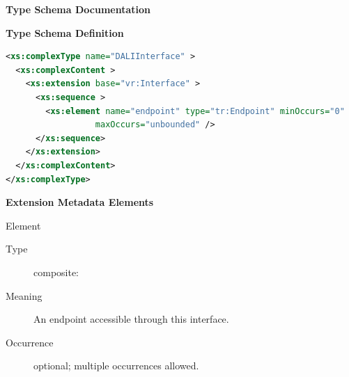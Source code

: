 \documentclass{ivoa}
\begin{document}
\begin{generated}
\begingroup
      	\renewcommand*\descriptionlabel[1]{%
      	\hbox to 5.5em{\emph{#1}\hfil}}\vspace{2ex}\noindent\textbf{ Type Schema Documentation}



\vspace{1ex}\noindent\textbf{ Type Schema Definition}

\begin{lstlisting}[language=XML,basicstyle=\footnotesize]
<xs:complexType name="DALIInterface" >
  <xs:complexContent >
    <xs:extension base="vr:Interface" >
      <xs:sequence >
        <xs:element name="endpoint" type="tr:Endpoint" minOccurs="0"
                  maxOccurs="unbounded" />
      </xs:sequence>
    </xs:extension>
  </xs:complexContent>
</xs:complexType>
\end{lstlisting}

\vspace{0.5ex}\noindent\textbf{ Extension Metadata Elements}

\begingroup\small\begin{bigdescription}\item[Element \xmlel{endpoint}]
\begin{description}
\item[Type] composite: 
\item[Meaning] 
                An endpoint accessible through this interface.
              
\item[Occurrence] optional; multiple occurrences allowed.

\end{description}


\end{bigdescription}\endgroup

\endgroup
\end{generated}
\end{document}
